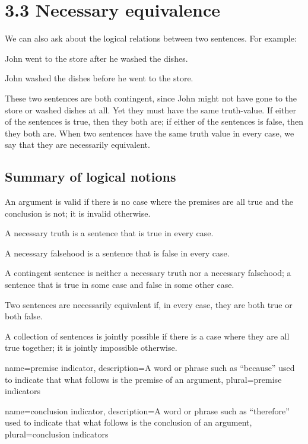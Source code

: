 \section{3.3 Necessary equivalence}
We can also ask about the logical relations between two sentences. For example:
\begin{earg}
\item[]John went to the store after he washed the dishes.
\item[]John washed the dishes before he went to the store.
\end{earg}
These two sentences are both contingent, since John might not have gone to the store or washed dishes at all. Yet they must have the same truth-value. If either of the sentences is true, then they both are; if either of the sentences is false, then they both are. When two sentences have the same truth value in every case, we say that they are necessarily equivalent.
\subsection{Summary of logical notions}
\begin{ebullet}
\item[\textbullet] An argument is valid if there is no case where the premises are all true and the conclusion is not; it is invalid otherwise.
\item[\textbullet] A necessary truth is a sentence that is true in every case.
\item[\textbullet] A necessary falsehood is a sentence that is false in every case.
\item[\textbullet] A contingent sentence is neither a necessary truth nor a necessary falsehood; a sentence that is true in some case and false in some other case.
\item[\textbullet] Two sentences are necessarily equivalent if, in every case, they are both true or both false.
\item[\textbullet] A collection of sentences is jointly possible if there is a case where they are all true together; it is jointly impossible otherwise.
\end{ebullet}

{
name=premise indicator,
description={A word or phrase such as ``because'' used to indicate that what follows is the premise of an argument},
plural=premise indicators
}

{
name=conclusion indicator,
description={A word or phrase such as ``therefore'' used to indicate that what follows is the conclusion of an argument},
plural=conclusion indicators
}

